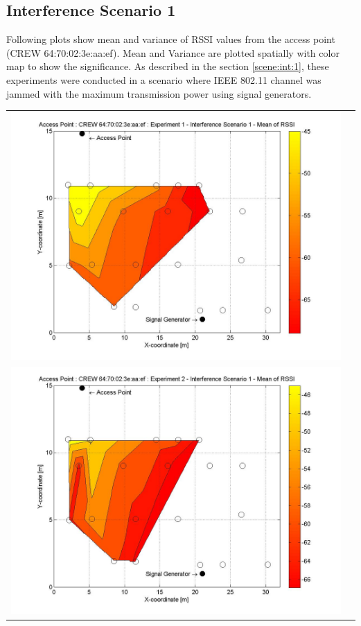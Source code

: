 \documentclass[11pt,a4paper,headinclude,footinclude,chapterprefix=on]{scrreprt}
\begin{document}
\subsection{Interference Scenario 1} 
Following plots show mean and variance of RSSI values from the access point (CREW 64:70:02:3e:aa:ef). Mean and Variance are plotted spatially with color map to show the significance. As described in the section \ref{scene:int:1}, these experiments were conducted in a scenario where IEEE 802.11 channel was jammed with the maximum transmission power using signal generators.
\begin{longtable}
	{lr} 
	\includegraphics[width=13cm]{../../Source/plot/CREW_ef/ef_Sig_Ex_1_Mean.jpg} \\
	\includegraphics[width=13cm]{../../Source/plot/CREW_ef/ef_Sig_Ex_2_Mean.jpg} \\

\end{longtable}
\end{document}
